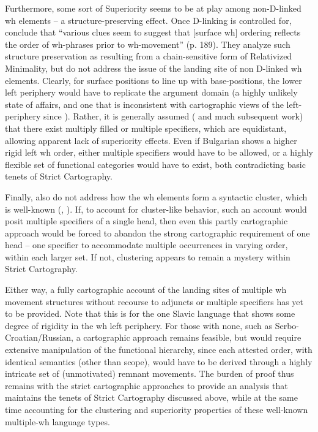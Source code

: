 \documentclass[output=paper]{langscibook}
\begin{document}
Furthermore, some sort of Superiority seems to be at play among non-D-linked wh elements – a structure-preserving effect. Once D-linking is controlled for, \citeauthor{KrapovaCinque2005} conclude that “various clues seem to suggest that [surface wh] ordering reflects the order of wh-phrases prior to wh-movement” (p. 189). They analyze such structure preservation as resulting from a chain-sensitive form of Relativized Minimality, but do not address the issue of the landing site of non D-linked wh elements. Clearly, for surface positions to line up with base-positions, the lower left periphery would have to replicate the argument domain (a highly unlikely state of affairs, and one that is inconsistent with cartographic views of the left-periphery since \citealt{rizzi1997}). Rather, it is generally assumed (\citealt{Richards.Norvin1997} and much subsequent work) that there exist multiply filled or multiple specifiers, which are equidistant, allowing apparent lack of superiority effects. Even if Bulgarian shows a higher rigid left wh order, either multiple specifiers would have to be allowed, or a highly flexible set of functional categories would have to exist, both contradicting basic tenets of Strict Cartography.

Finally, \citet{KrapovaCinque2005} also do not address how the wh elements form a syntactic cluster, which is well-known (\citealt{Grewendorf2001}, \citealt{Bailyn2018}). If, to account for cluster-like behavior, such an account would posit multiple specifiers of a single head, then even this partly cartographic approach would be forced to abandon the strong cartographic requirement of one head -- one specifier to accommodate multiple occurrences in varying order, within each larger set. If not, clustering appears to remain a mystery within Strict Cartography.

Either way, a fully cartographic account of the landing sites of multiple wh movement structures without recourse to adjuncts or multiple specifiers has yet to be provided.  Note that this is for the one Slavic language that shows some degree of rigidity in the wh left periphery. For those with none, such as Serbo-Croatian/Russian, a cartographic approach remains feasible, but would require extensive manipulation of the functional hierarchy, since each attested order, with identical semantics (other than scope), would have to be derived through a highly intricate set of (unmotivated) remnant movements. The burden of proof thus remains with the strict cartographic approaches to provide an analysis that maintains the tenets of Strict Cartography discussed above, while at the same time accounting for the clustering and superiority properties of these well-known multiple-wh language types.
\end{document}
